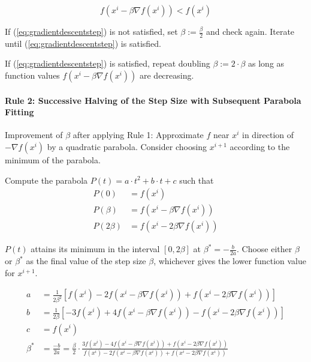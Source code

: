 \documentclass[11pt]{article}
\begin{document}
\begin{equation}
	f(x^i - \beta \nabla f(x^i)) < f(x^i)
	\label{eq:gradientdescentstep}
\end{equation}

\noindent
If (\ref{eq:gradientdescentstep}) is not satisfied, set $\beta := \frac{\beta}{2}$ and check again. Iterate until (\ref{eq:gradientdescentstep}) is satisfied.

If (\ref{eq:gradientdescentstep}) is satisfied, repeat doubling $\beta := 2\cdot\beta$ as long as function values $f(x^i - \beta \nabla f(x^i))$ are decreasing.

\paragraph{Rule 2: Successive Halving of the Step Size with Subsequent Parabola Fitting}

Improvement of $\beta$ after applying Rule 1: Approximate $f$ near $x^i$ in direction of $-\nabla f(x^i)$ by a quadratic parabola. Consider choosing $x^{i+1}$ according to the minimum of the parabola.

Compute the parabola $P(t) = a\cdot t^2 + b\cdot t + c$ such that
\begin{align*}
	P(0) &= f(x^i)\\
	P(\beta) &= f\left(x^i - \beta\nabla f(x^i)\right)\\
	P(2\beta) &= f\left(x^i - 2\beta\nabla f(x^i)\right)
\end{align*}

\noindent
$P(t)$ attains its minimum in the interval $[0, 2\beta]$ at $\beta^* = - \frac{b}{2a}$. Choose either $\beta$ or $\beta^*$ as the final value of the step size $\beta$, whichever gives the lower function value for $x^{i+1}$.

\begin{align*}
	a &= \frac{1}{2\beta^2} \left[ f(x^i) - 2 f\left(x^i - \beta\nabla f(x^i)\right) + f\left(x^i - 2\beta\nabla f(x^i)\right)\right]\\
	b &= \frac{1}{2\beta} \left[ -3 f(x^i) + 4 f\left(x^i - \beta\nabla f(x^i)\right) - f\left(x^i - 2\beta\nabla f(x^i)\right) \right] \\
	c &= f(x^i)\\
	\beta^* &= \frac{-b}{2a} = \frac{\beta}{2} \cdot \frac{3 f(x^i) - 4 f\left(x^i - \beta\nabla f(x^i)\right) + f\left(x^i - 2\beta\nabla f(x^i)\right)}{f(x^i) - 2 f\left(x^i - \beta\nabla f(x^i)\right) + f\left(x^i - 2\beta\nabla f(x^i)\right)}
\end{align*}
\end{document}
